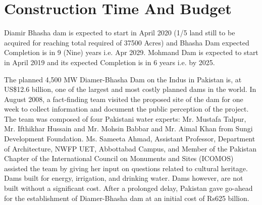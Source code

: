 \documentclass[11pt, journal,letterpaper,compsoc]{IEEEtran}
\begin{document}
 
 \section{Construction Time And Budget}
Diamir Bhasha dam is expected to start in April 2020 (1/5 land still to be acquired for reaching total required of 37500 Acres) and Bhasha Dam expected Completion is in 9 (Nine) years i.e. Apr 2029.
Mohmand Dam is expected to start in April 2019 and its expected Completion is in 6 years i.e. by 2025.

The planned 4,500 MW Diamer-Bhasha Dam on the Indus in Pakistan is, at US\$12.6
billion, one of the largest and most costly planned dams in the world. In August 2008,
a fact-finding team visited the proposed site of the dam for one week to collect
information and document the public perception of the project. The team was
composed of four Pakistani water experts: Mr. Mustafa Talpur, Mr. Ifthikhar Hussain
and Mr. Mohsin Babbar and Mr. Aimal Khan from Sungi Development Foundation.
Ms. Sameeta Ahmad, Assistant Professor, Department of Architecture, NWFP UET,
Abbottabad Campus, and Member of the Pakistan Chapter of the International
Council on Monuments and Sites (ICOMOS) assisted the team by giving her input on
questions related to cultural heritage.
Dams built for energy, irrigation, and drinking water. Dams however, are not built without a significant cost. After a prolonged delay, Pakistan gave go-ahead for the establishment of Diamer-Bhasha dam at an initial cost of Rs625 billion.
\end{document}
